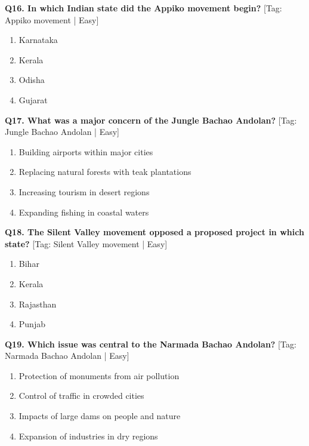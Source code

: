 \noindent\textbf{Q16. In which Indian state did the Appiko movement begin?} \hfill [Tag: Appiko movement | Easy]
\begin{enumerate}[label=(\alph*),topsep=2pt,itemsep=1pt,partopsep=0pt,parsep=0pt]
    \item {Karnataka}
    \item {Kerala}
    \item {Odisha}
    \item {Gujarat}
\end{enumerate}
\vspace{2mm}

\noindent\textbf{Q17. What was a major concern of the Jungle Bachao Andolan?} \hfill [Tag: Jungle Bachao Andolan | Easy]
\begin{enumerate}[label=(\alph*),topsep=2pt,itemsep=1pt,partopsep=0pt,parsep=0pt]
    \item {Building airports within major cities}
    \item {Replacing natural forests with teak plantations}
    \item {Increasing tourism in desert regions}
    \item {Expanding fishing in coastal waters}
\end{enumerate}
\vspace{2mm}

\noindent\textbf{Q18. The Silent Valley movement opposed a proposed project in which state?} \hfill [Tag: Silent Valley movement | Easy]
\begin{enumerate}[label=(\alph*),topsep=2pt,itemsep=1pt,partopsep=0pt,parsep=0pt]
    \item {Bihar}
    \item {Kerala}
    \item {Rajasthan}
    \item {Punjab}
\end{enumerate}
\vspace{2mm}

\noindent\textbf{Q19. Which issue was central to the Narmada Bachao Andolan?} \hfill [Tag: Narmada Bachao Andolan | Easy]
\begin{enumerate}[label=(\alph*),topsep=2pt,itemsep=1pt,partopsep=0pt,parsep=0pt]
    \item {Protection of monuments from air pollution}
    \item {Control of traffic in crowded cities}
    \item {Impacts of large dams on people and nature}
    \item {Expansion of industries in dry regions}
\end{enumerate}
\vspace{2mm}

